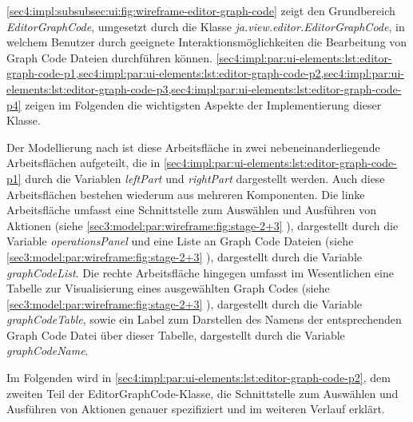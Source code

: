 \cref{sec4:impl:subsubsec:ui:fig:wireframe-editor-graph-code} zeigt den Grundbereich \textit{EditorGraphCode}, umgesetzt durch die Klasse \textit{ja.view.editor.EditorGraphCode}, in welchem Benutzer durch geeignete Interaktionsmöglichkeiten die Bearbeitung von Graph Code Dateien durchführen können.
\cref{sec4:impl:par:ui-elements:lst:editor-graph-code-p1,sec4:impl:par:ui-elements:lst:editor-graph-code-p2,sec4:impl:par:ui-elements:lst:editor-graph-code-p3,sec4:impl:par:ui-elements:lst:editor-graph-code-p4} zeigen im Folgenden die wichtigsten Aspekte der Implementierung dieser Klasse.



Der Modellierung nach ist diese Arbeitsfläche in zwei nebeneinanderliegende Arbeitsflächen aufgeteilt, die in \cref{sec4:impl:par:ui-elements:lst:editor-graph-code-p1} durch die Variablen \textit{leftPart} und \textit{rightPart} dargestellt werden.
Auch diese Arbeitsflächen bestehen wiederum aus mehreren Komponenten.
Die linke Arbeitsfläche umfasst eine Schnittstelle zum Auswählen und Ausführen von Aktionen (siehe \cref{sec3:model:par:wireframe:fig:stage-2+3} ), dargestellt durch die Variable \textit{operationsPanel} und eine Liste an Graph Code Dateien (siehe \cref{sec3:model:par:wireframe:fig:stage-2+3} ), dargestellt durch die Variable \textit{graphCodeList}.
Die rechte Arbeitsfläche hingegen umfasst im Wesentlichen eine Tabelle zur Visualisierung eines ausgewählten Graph Codes (siehe \cref{sec3:model:par:wireframe:fig:stage-2+3} ), dargestellt durch die Variable \textit{graphCodeTable}, sowie ein Label zum Darstellen des Namens der entsprechenden Graph Code Datei über dieser Tabelle, dargestellt durch die Variable \textit{graphCodeName}.

Im Folgenden wird in \cref{sec4:impl:par:ui-elements:lst:editor-graph-code-p2}, dem zweiten Teil der EditorGraphCode-Klasse, die Schnittstelle  zum Auswählen und Ausführen von Aktionen genauer spezifiziert und im weiteren Verlauf erklärt.



